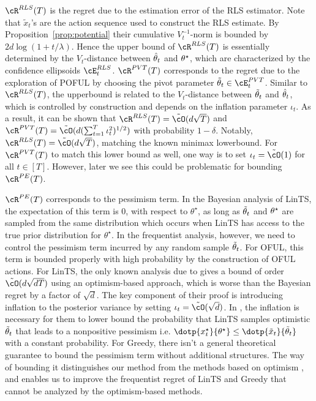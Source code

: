 $\cR^{RLS}(T)$ is the regret due to the estimation error of the RLS estimator. Note that $\tilde{x}_t$'s are the action sequence used to construct the RLS estimate. By Proposition~\ref{prop:potential} their cumulative $V_t^{-1}$-norm is bounded by $2d\log(1+t/\lambda)$. Hence the upper bound of $\cR^{RLS}(T)$ is essentially determined by the $V_t$-distance between $\hat{\theta}_t$ and $\theta^\star$, which are characterized by the confidence ellipsoids $\cE^{RLS}_t$. $\cR^{\PVT}(T)$ corresponds to the regret due to the exploration of POFUL by choosing the pivot parameter $\tilde{\theta}_t\in\cE^{\PVT}_t$. Similar to  $\cR^{RLS}(T)$, the upperbound is related to the $V_t$-distance between $\tilde{\theta}_t$ and $\hat{\theta}_t$, which is controlled by construction and depends on the inflation parameter $\iota_t$. As a result, it can be shown that 
$\cR^{RLS}(T)  = \tilde{\cO}(d\sqrt{T}) $ and $\cR^{\PVT}(T)  = \tilde{\cO}(d(\sum_{t = 1}^T \iota_{t}^2)^{1/2}) $ with probability $1-\delta$.  Notably, $\cR^{RLS}(T) = \tilde{\cO}(d\sqrt{T})  $, matching the known minimax lowerbound. For $\cR^{\PVT}(T)$ to match this lower bound as well, one way is to set $\iota_{t}=
\tilde{\cO}(1)$ for all $t\in[T]$. However, later we see this could be problematic for bounding $\cR^{PE}(T)$.

$\cR^{PE}(T)$ corresponds to the pessimism term.  In the Bayesian analysis of LinTS, the expectation of this term is $0$, with respect to $\theta^\star$, as long as $\tilde{\theta}_t$ and $\theta^\star$ are sampled from the same distribution which occurs when LinTS has access to the true prior distribution for $\theta^\star$. In the frequentist analysis, however, we need to control the pessimism term incurred by any random sample $\tilde{\theta}_t$. For OFUL, this term is bounded properly with high probability by the construction of OFUL actions. For LinTS, the only known analysis due to \cite{agrawal2013thompson,abeille2017linear} gives a bound of order $\tilde{\cO}(d\sqrt{dT})$ using an optimism-based approach, which is worse than the Bayesian regret by a factor of $\sqrt{d}$. The key component of their proof is introducing inflation to the posterior variance by setting $\iota_t =\tilde{\cO}(\sqrt{d})$. In \cite{abeille2017linear},  the inflation is necessary for them to lower bound the probability that LinTS samples optimistic $\tilde{\theta}_t$ that leads to a nonpositive pessimism i.e. $\dotp{x_t^\star}{ \theta^{\star}}\leq \dotp{\tilde{x}_t}{\tilde{\theta}_t}$ with a constant probability. For Greedy, there isn't a general theoretical guarantee to bound the pessimism term without additional structures. The way of bounding it distinguishes our method from the methods based on optimism \citep{agrawal2013thompson,abeille2017linear}, and enables us to improve the frequentist regret of LinTS and Greedy that cannot be analyzed by the optimism-based methods. 

